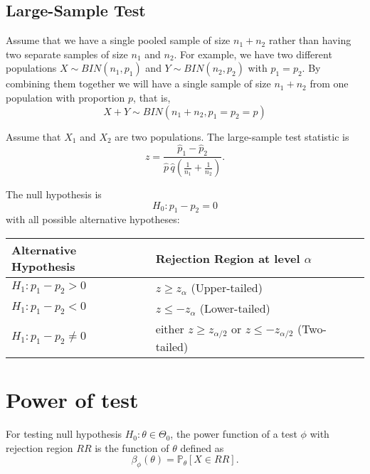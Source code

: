 \subsection{Large-Sample Test}

Assume that we have a single pooled sample of size $n_1 + n_2$ rather than having two separate samples of size $n_1$ and $n_2$.
For example, we have two different populations $X \sim BIN(n_1, p_1)$ and $Y \sim BIN(n_2, p_2)$ with $p_1 = p_2$. By combining them together 
we will have a single sample of size $n_1 + n_2$ from one population with proportion $p$, that is,
\[
    X + Y \sim BIN(n_1 + n_2, p_1 = p_2 = p)
\]

\begin{definition}
    Assume that $X_1$ and $X_2$ are two populations. The large-sample test statistic is
    \begin{equation}
        z = \frac{\widehat{p}_1 - \widehat{p}_2}{\displaystyle \widehat{p}\, \widehat{q} \left(\frac{1}{n_1} + \frac{1}{n_2} \right)}.
    \end{equation}

    The null hypothesis is
    \[
        H_0 : p_1 - p_2 = 0
    \]
    with all possible alternative hypotheses:

    \renewcommand{\arraystretch}{1.2}
    \begin{tabularx}{\textwidth}{|l|X|}
    \hline
    Alternative Hypothesis & Rejection Region at level $\alpha$\\
    \hline
    $H_1 :  p_1 - p_2 > 0$ & $z \geq z_\alpha$ (Upper-tailed)\\
    \hline
    $H_1 :  p_1 - p_2 < 0$ & $z \leq -z_\alpha$ (Lower-tailed)\\
    \hline
    $H_1 :  p_1 - p_2 \neq 0$ & either $z \geq z_{\alpha/2}$ or $z \leq -z_{\alpha/2}$ (Two-tailed)\\
    \hline
    \end{tabularx}
\end{definition}


\section{Power of test}

\begin{definition}
    For testing null hypothesis $H_0 : \theta \in \Theta_0$, the power function 
    of a test $\phi$ with rejection region $RR$ is the function of $\theta$ defined as 
    \begin{equation}
        \beta_\phi(\theta) = \mathbb{P}_\theta[X \in RR].
    \end{equation}
\end{definition}

